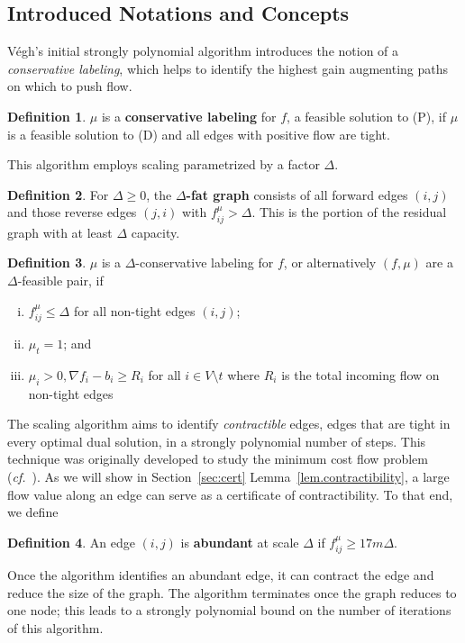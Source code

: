 \documentclass[11pt]{article}
\theoremstyle{definition}
\newtheorem{definition}{Definition}[section]
\theoremstyle{definition}
\newcommand{\nfi}{\nabla f_i}
\newcommand{\todo}[1]{}%
\begin{document}
	\subsection{Introduced Notations and Concepts}
    \label{sec:2013-notation}
	Végh's initial strongly polynomial algorithm \cite{Vegh2013}
	introduces the notion of a \textit{conservative labeling}, which helps to
	identify the highest gain augmenting paths on which to push flow.
	\begin{definition}
	$\mu$ is a \textbf{conservative labeling} for $f$, a feasible solution to (P), if $\mu$ is
	a feasible solution to (D) and all edges with positive flow are tight.
	\end{definition}
	
	This algorithm employs scaling parametrized by a factor $\Delta$.
    \begin{definition}
	For $\Delta \geq 0$, the \textbf{$\Delta$-fat graph} consists of all
	forward edges $(i, j)$ and those reverse edges $(j, i)$ with $f_{ij}^\mu > \Delta$. This
    is the portion of the residual graph with at least $\Delta$ capacity.
    \end{definition}
    \begin{definition}
    $\mu$ is a $\Delta$-conservative labeling for $f$, or alternatively $(f, \mu)$ are a
	$\Delta$-feasible pair, if
        \begin{enumerate}[(i)]
        \item $f_{ij}^\mu \leq \Delta$ for all non-tight edges $(i, j)$;
        \item $\mu_t = 1$; and
        \item $\mu_i > 0, \nfi - b_i \geq R_i$ for all $i \in V \setminus t$ where $R_i$ is the total incoming flow on non-tight edges
        \end{enumerate}
   \end{definition}
    
	The scaling algorithm aims to identify \emph{contractible} edges,
	edges that are tight in every optimal dual solution,
    in a strongly polynomial number of steps. This technique was
    originally developed to study the minimum cost flow problem (\emph{cf.}~\cite{Orlin1988}). \todo{need to define this or refer to section 3?}
	As we will show in Section~\ref{sec:cert} Lemma~\ref{lem.contractibility}, a large flow value along an edge can
    serve as a certificate of contractibility. To that end, we define
    \begin{definition}
    An edge $(i, j)$ is \textbf{abundant} at scale $\Delta$ if $f_{ij}^\mu \geq 17m\Delta$.
    \end{definition}
		\todo{At least give intuition for how they derived this number}
	Once the algorithm identifies an abundant edge,
	it can contract the edge and reduce the size of the graph. The algorithm
	terminates once the graph reduces to one node; this leads to a
	strongly polynomial bound on the number of iterations of this algorithm.
\end{document}
